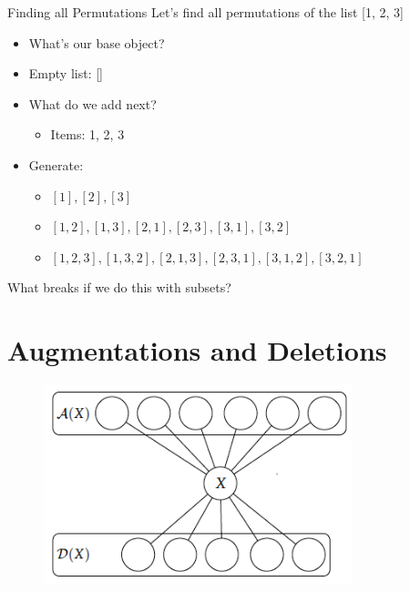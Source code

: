 \documentclass[aspectratio=169]{beamer}
\begin{document}
\begin{frame}{Finding all Permutations}
    Let's find all permutations of the list [1, 2, 3] 
\begin{itemize}
    \item What's our base object? \pause
    \item Empty list: [] \pause
    \item What do we add next?
    \begin{itemize}
        \item Items: 1, 2, 3
    \end{itemize}
    \item Generate: 
    \begin{itemize}
        \item $[1], [2], [3]$ \pause
        \item $[1, 2], [1, 3], [2, 1], [2, 3], [3, 1], [3, 2]$ \pause
        \item $[1, 2, 3], [1, 3, 2], [2, 1, 3], [2, 3, 1], [3, 1, 2], [3, 2, 1]$ \pause
    \end{itemize}
\end{itemize}
    \vspace{20pt}
    \textcolor{sigma@alertred}{What breaks if we do this with subsets?}
\end{frame}

\section{Augmentations and Deletions}
\frame{\sectionpage}

\begin{frame}{}
    \begin{figure}
        \centering
        \includegraphics[width = 0.8\textwidth]{aug_delete.png}
    \end{figure}
\end{frame}
\end{document}
